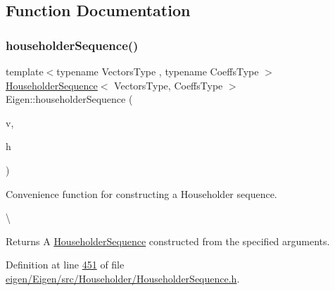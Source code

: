 \subsection{Function Documentation}
\mbox{\label{group___householder___module_ga4bd4b85120e014cf1125a054b02d4d92}} 
\subsubsection{\texorpdfstring{householder\+Sequence()}{householderSequence()}}
{\footnotesize\ttfamily template$<$typename Vectors\+Type , typename Coeffs\+Type $>$ \\
\hyperlink{group___householder___module_class_eigen_1_1_householder_sequence}{Householder\+Sequence}$<$ Vectors\+Type, Coeffs\+Type $>$ Eigen\+::householder\+Sequence (\begin{DoxyParamCaption}\item[{const Vectors\+Type \&}]{v,  }\item[{const Coeffs\+Type \&}]{h }\end{DoxyParamCaption})}



Convenience function for constructing a Householder sequence. 

\textbackslash{} \begin{DoxyReturn}{Returns}
A \hyperlink{group___householder___module_class_eigen_1_1_householder_sequence}{Householder\+Sequence} constructed from the specified arguments. 
\end{DoxyReturn}


Definition at line \hyperlink{eigen_2_eigen_2src_2_householder_2_householder_sequence_8h_source_l00451}{451} of file \hyperlink{eigen_2_eigen_2src_2_householder_2_householder_sequence_8h_source}{eigen/\+Eigen/src/\+Householder/\+Householder\+Sequence.\+h}.

\mbox{\label{group___householder___module_ga59f16274f9e66f902f1a4b3f23e8b002}} 
